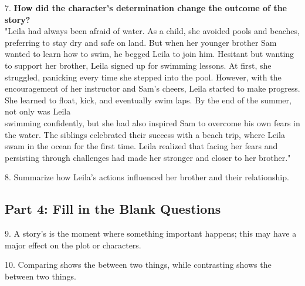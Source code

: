 \documentclass[12pt]{article}
\begin{document}
7. \textbf{How did the character’s determination change the outcome of the story?}\\
"Leila had always been afraid of water. As a child, she avoided pools and beaches, preferring to stay dry and safe on land. But when her younger brother Sam wanted to learn how to swim, he begged Leila to join him. Hesitant but wanting to support her brother, Leila signed up for swimming lessons. At first, she struggled, panicking every time she stepped into the pool. However, with the encouragement of her instructor and Sam’s cheers, Leila started to make progress. She learned to float, kick, and eventually swim laps. By the end of the summer, not only was Leila \\swimming confidently, but she had also inspired Sam to overcome his own fears in the water. The siblings celebrated their success with a beach trip, where Leila swam in the ocean for the first time. Leila realized that facing her fears and persisting through challenges had made her stronger and closer to her brother."\\
\vspace{3.5cm}

8. Summarize how Leila’s actions influenced her brother and their relationship.\\
\vspace{4cm}

\subsection*{Part 4: Fill in the Blank Questions}
\vspace{1em}
9. A story’s \underline{\hspace{4cm}} is the moment where something important happens; this may have a major effect on the plot or characters.

\vspace{3cm}

10. Comparing shows the  \underline{\hspace{4cm}} between two things, while contrasting shows the \underline{\hspace{4cm}} between two things.

\vspace{3cm}

\end{document}
